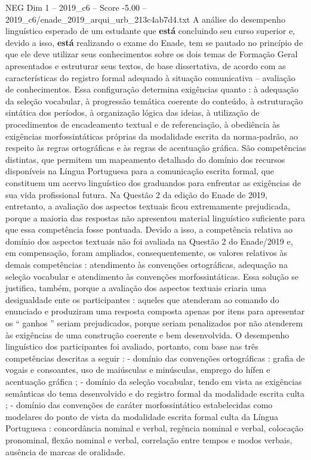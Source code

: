 \begin{textsample}{NEG Dim 1 – 2019\_c6 – Score -5.00 – 2019\_c6/enade\_2019\_arqui\_urb\_213c4ab7d4.txt}
A análise do desempenho linguístico esperado de um estudante que \textbf{está} concluindo seu curso superior e, devido a isso, \textbf{está} realizando o exame do Enade, tem se pautado no princípio de que ele deve utilizar seus conhecimentos sobre os dois temas de Formação Geral apresentados e estruturar seus textos, de base dissertativa, de acordo com as características do registro formal adequado à situação comunicativa – avaliação de conhecimentos.
Essa configuração determina exigências quanto : à adequação da seleção vocabular, à progressão temática coerente do conteúdo, à estruturação sintática dos períodos, à organização lógica das ideias, à utilização de procedimentos de encadeamento textual e de referenciação, à obediência às exigências morfossintáticas próprias da modalidade escrita da norma-padrão, ao respeito às regras ortográficas e às regras de acentuação gráfica.
São competências distintas, que permitem um mapeamento detalhado do domínio dos recursos disponíveis na Língua Portuguesa para a comunicação escrita formal, que constituem um acervo linguístico dos graduandos para enfrentar as exigências de sua vida profissional futura.
Na Questão 2 da edição do Enade de 2019, entretanto, a avaliação dos aspectos textuais ficou extremamente prejudicada, porque a maioria das respostas não apresentou material linguístico suficiente para que essa competência fosse pontuada.
Devido a isso, a competência relativa ao domínio dos aspectos textuais não foi avaliada na Questão 2 do Enade/2019 e, em compensação, foram ampliados, consequentemente, os valores relativos às demais competências : atendimento às convenções ortográficas, adequação na seleção vocabular e atendimento às convenções morfossintáticas.
Essa solução se justifica, também, porque a avaliação dos aspectos textuais criaria uma desigualdade ente os participantes : aqueles que atenderam ao comando do enunciado e produziram uma resposta composta apenas por itens para apresentar os “ ganhos ” seriam prejudicados, porque seriam penalizados por não atenderem às exigências de uma construção coerente e bem desenvolvida.
O desempenho linguístico dos participantes foi avaliado, portanto, com base nas três competências descritas a seguir : - domínio das convenções ortográficas : grafia de vogais e consoantes, uso de maiúsculas e minúsculas, emprego do hífen e acentuação gráfica ; - domínio da seleção vocabular, tendo em vista as exigências semânticas do tema desenvolvido e do registro formal da modalidade escrita culta ; - domínio das convenções de caráter morfossintático estabelecidas como modelares do ponto de vista da modalidade escrita formal culta da Língua Portuguesa : concordância nominal e verbal, regência nominal e verbal, colocação pronominal, flexão nominal e verbal, correlação entre tempos e modos verbais, ausência de marcas de oralidade.

\end{textsample}
